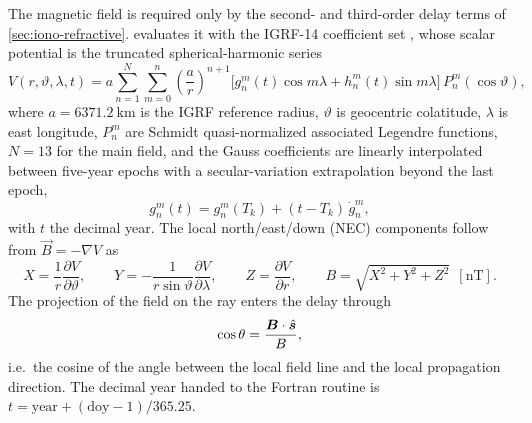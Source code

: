 The magnetic field is required only by the second- and third-order delay terms
of \cref{sec:iono-refractive}.  \lupnt{} evaluates it with the IGRF-14
coefficient set \citep{alken2021igrf}, whose scalar potential is the truncated
spherical-harmonic series
%
\begin{equation}
  \label{eq:iono-igrf-potential}
  V(r,\vartheta,\lambda,t)
  = a \sum_{n=1}^{N} \sum_{m=0}^{n}
    \left(\frac{a}{r}\right)^{n+1}
    \Big[ g_n^m(t)\cos m\lambda + h_n^m(t)\sin m\lambda \Big]\,
    P_n^m(\cos\vartheta) ,
\end{equation}
%
where $a = \SI{6371.2}{\kilo\meter}$ is the IGRF reference radius,
$\vartheta$ is geocentric colatitude, $\lambda$ is east longitude, $P_n^m$ are
Schmidt quasi-normalized associated Legendre functions, $N = 13$ for the main
field, and the Gauss coefficients are linearly interpolated between five-year
epochs with a secular-variation extrapolation beyond the last epoch,
%
\begin{equation}
  g_n^m(t) = g_n^m(T_k) + (t - T_k)\,\dot{g}_n^m ,
\end{equation}
%
with $t$ the decimal year.  The local north/east/down (NEC) components follow
from $\vec{B} = -\nabla V$ as
%
\begin{equation}
  \label{eq:iono-bfield}
  X = \frac{1}{r}\frac{\partial V}{\partial \vartheta},
  \qquad
  Y = -\frac{1}{r\sin\vartheta}\frac{\partial V}{\partial \lambda},
  \qquad
  Z = \frac{\partial V}{\partial r},
  \qquad
  B = \sqrt{X^2 + Y^2 + Z^2} \ \ [\si{\nano\tesla}] .
\end{equation}
%
The projection of the field on the ray enters the delay through
%
\begin{equation}
  \label{eq:iono-costheta}
  \cos\theta = \frac{\bm{B}\cdot\hat{\bm{s}}}{B} ,
\end{equation}
%
i.e.\ the cosine of the angle between the local field line and the local
propagation direction.  The decimal year handed to the Fortran routine is
$t = \mathrm{year} + (\mathrm{doy}-1)/365.25$.

